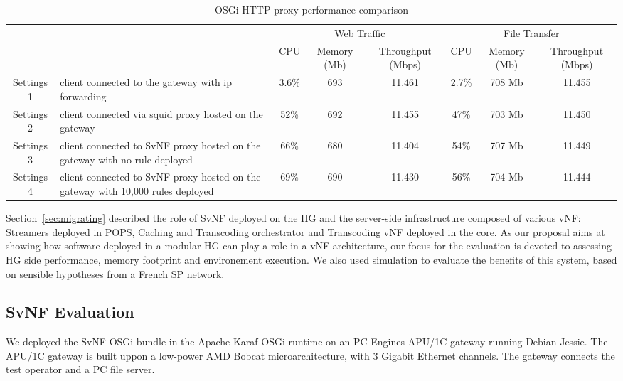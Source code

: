 \begin{table}
	\centering
	\begin{tabular}{| c | p{}|c |c |c || c |c |c |}
	
	
 	    \multicolumn{2}{c}{} & \multicolumn{3}{c}{Web Traffic} 		  & \multicolumn{3}{c}{File Transfer} \\
 	     \cline{3-8}	
             \multicolumn{2}{c|}{} & CPU 			& Memory (Mb) 		& Throughput (Mbps)	& CPU 		& Memory (Mb)		& Throughput (Mbps) \\\hline   
Settings 1 & client connected to the gateway with ip forwarding &   3.6\% 		& 693 		& 11.461		& 2.7\%		& 708 Mb		& 11.455 \\\hline
Settings 2 & client connected via squid proxy hosted on the gateway   &   52\%        & 692 		& 11.455		& 47\%		& 703 Mb		& 11.450 \\\hline
Settings 3 & client connected to SvNF proxy hosted on the gateway with no rule deployed &   66\%		& 680 		& 11.404		& 54\%		& 707 Mb		& 11.449 \\\hline
Settings 4 & client connected to SvNF proxy hosted on the gateway with 10,000 rules deployed   &   69\%        & 690 		& 11.430		& 56\%		& 704 Mb		& 11.444 \\\hline
	
	            
	\end{tabular}
	\caption{
	OSGi HTTP proxy performance comparison
	\label{tab:perf-comparison}
	}
	
\end{table}

Section~\ref{sec:migrating} described the role of SvNF deployed on the HG and the server-side infrastructure composed of various vNF: Streamers deployed in POPS, Caching and Transcoding orchestrator and Transcoding vNF deployed in the core.
As our proposal aims at showing how software deployed in a modular HG can play a role in a vNF architecture, our focus for the evaluation is devoted to assessing HG side performance, memory footprint and environement execution. We also used simulation to evaluate the benefits of this system, based on sensible hypotheses from a French SP network.


\subsection{SvNF Evaluation }\label{Testbed}

We deployed the SvNF OSGi bundle in the Apache Karaf OSGi runtime on an PC Engines APU/1C gateway running Debian Jessie. 
The APU/1C gateway is built uppon a low-power AMD Bobcat microarchitecture, with 3 Gigabit Ethernet channels. The gateway connects the test operator and a PC file server.

